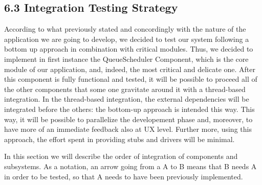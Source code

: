  \subsection{6.3 Integration Testing Strategy}
\label{subsect:integrationtestingstrategy}
According to what previously stated and concordingly with the nature of the application we are going to develop, we decided to test our system following a bottom up approach in combination with critical modules.
Thus, we decided to implement in first instance the QueueScheduler Component, which is the core module of our application, and, indeed, the most critical and delicate one. After this component is fully functional and tested, it will be possible to proceed all of the other components that some one gravitate around it with a thread-based integration. In the thread-based integration, the external dependencies will be integrated before the others: the bottom-up approach is intended this way.
This way, it will be possible to parallelize the developement phase and, moreover, to have more of an immediate feedback also at UX level. Further more, using this approach, the effort spent in providing stubs and drivers will be minimal.

In this section we will describe the order of integration of components and subsystems.
As a notation, an arrow going from a A to B means that B needs A in order to be tested, so that A needs to have been previously implemented.

